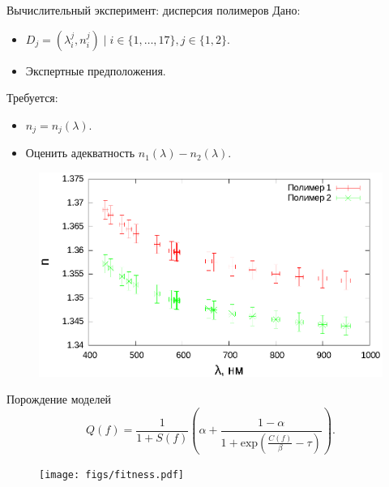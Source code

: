 \documentclass{beamer}
\begin{document}
\begin{frame}{Вычислительный эксперимент: дисперсия полимеров}
  Дано:
  \begin{itemize}
    \item $D_j = (\lambda_i^j, n_i^j) \mid i \in \{ 1, \dots, 17 \}, j \in \{ 1, 2 \}.$
    \item Экспертные предположения.
  \end{itemize}
  
  Требуется:
  \begin{itemize}
    \item $n_j = n_j(\lambda).$
    \item Оценить адекватность $n_1 (\lambda) - n_2 (\lambda)$.
  \end{itemize}
  
  \begin{figure}[h]
    \vspace{-20pt}
    \includegraphics[scale=0.6]{figs/polymers.eps}
    \vspace{-30pt}
  \end{figure}
\end{frame}

\begin{frame}{Порождение моделей}
  \[
    Q(f) = \frac{1}{1 + S(f)} \left(\alpha + \frac{1 - \alpha}{1 + \text{exp} (\frac{C(f)}{\beta} - \tau)}\right).
  \]

  \begin{figure}[h]
    \vspace{-20pt}
    \texttt{[image: figs/fitness.pdf]}
    \vspace{-30pt}
  \end{figure}
\end{frame}
\end{document}
